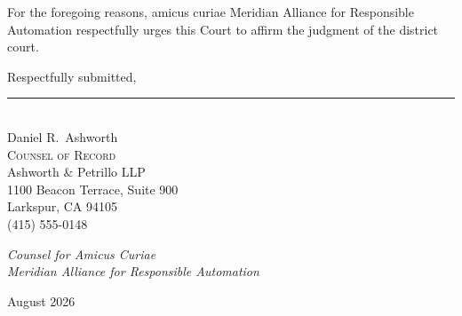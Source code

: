 

For the foregoing reasons, amicus curiae Meridian Alliance for Responsible Automation respectfully urges this Court to affirm the judgment of the district court.

\bigskip
\begin{flushright}
\begin{minipage}{3.0in}
\raggedleft
Respectfully submitted,

\vspace{18pt}
\rule{2.2in}{0.4pt}\\
Daniel R.\ Ashworth\\
\textsc{Counsel of Record}\\
Ashworth \& Petrillo LLP\\
1100 Beacon Terrace, Suite 900\\
Larkspur, CA 94105\\
(415) 555-0148

\medskip
\textit{Counsel for Amicus Curiae}\\
\textit{Meridian Alliance for Responsible Automation}

\medskip
August 2026
\end{minipage}
\end{flushright}
